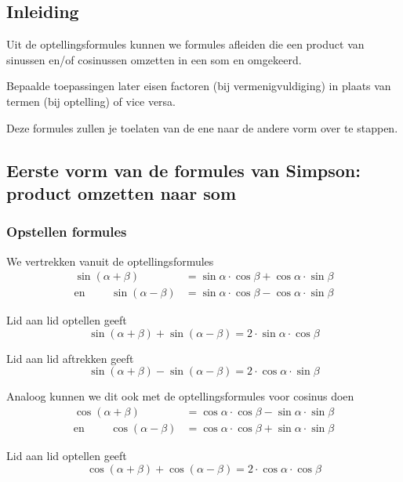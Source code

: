 \documentclass[a4paper,12pt]{article}
\begin{document}
\begin{theorie}

\subsection{Inleiding}

Uit de optellingsformules kunnen we formules afleiden die een product van
sinussen en/of cosinussen omzetten in een som en omgekeerd.

Bepaalde toepassingen later eisen factoren (bij vermenigvuldiging) in plaats van
termen (bij optelling) of vice versa.

Deze formules zullen je toelaten van de ene naar de andere vorm over te stappen.

\subsection{Eerste vorm van de formules van Simpson: product omzetten naar som}

\subsubsection*{Opstellen formules}

We vertrekken vanuit de optellingsformules
\begin{align*}
                   \sin(\alpha + \beta) &= \sin\alpha\cdot\cos\beta + \cos\alpha\cdot\sin\beta\\
  \mbox{en }\qquad \sin(\alpha - \beta) &= \sin\alpha\cdot\cos\beta - \cos\alpha\cdot\sin\beta
\end{align*}

Lid aan lid optellen geeft
$$\sin(\alpha+\beta) + \sin(\alpha - \beta) = 2\cdot\sin\alpha\cdot\cos\beta$$

Lid aan lid aftrekken geeft
$$\sin(\alpha+\beta) - \sin(\alpha - \beta) = 2\cdot\cos\alpha\cdot\sin\beta$$

Analoog kunnen we dit ook met de optellingsformules voor cosinus doen
\begin{align*}
                   \cos(\alpha + \beta) &= \cos\alpha\cdot\cos\beta - \sin\alpha\cdot\sin\beta\\
  \mbox{en }\qquad \cos(\alpha - \beta) &= \cos\alpha\cdot\cos\beta + \sin\alpha\cdot\sin\beta
\end{align*}

Lid aan lid optellen geeft
$$\cos(\alpha+\beta) + \cos(\alpha - \beta) = 2\cdot\cos\alpha\cdot\cos\beta$$


\end{theorie}
\end{document}
